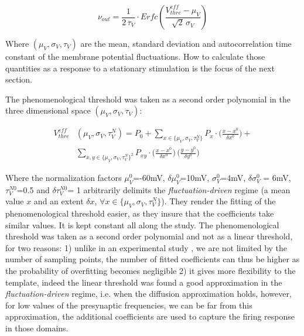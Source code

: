 \documentclass[8pt, colorlinks, a4paper]{article}
\begin{document}
\begin{equation}
\label{eq:template}
  \nu_{out} = \frac{1}{2\,\tau_V} \cdot 
  {Erfc}(\frac{V_{thre}^{eff}-\mu_V}{\sqrt{2} \, \sigma_V})
\end{equation}

Where \( (\mu_V, \sigma_V, \tau_V) \) are the mean, standard deviation
and autocorrelation time constant of the membrane potential
fluctuations. How to calculate those quantities as a response to a
stationary stimulation is the focus of the next section.

The phenomenological threshold was taken as a second order polynomial
in the three dimensional space \( (\mu_V, \sigma_V, \tau_V) \):

\begin{equation}
\label{eq:quadratic-threshold}
  \begin{split}
   V_{thre}^{eff} & (\mu_V, \sigma_V, \tau_V^N) = P_0 + 
   \sum_{x \in \{ \mu_V, \sigma_V, \tau_V^N\}} P_x \cdot \Big(  \frac{x - x^0}{\delta x^0} \Big) + \\
   & \sum_{ x,y \in \{ \mu_V, \sigma_V, \tau_V^N\}^2} P_{xy} \cdot
   \Big( \frac{x - x^0}{\delta x^0}  \Big) \,  \Big( \frac{y - y^0}{\delta y^0} \Big)
 \end{split}
\end{equation}

Where the normalization factors \(\mu_V^0\)=-60mV, \(\delta
\mu_V^0\)=10mV, \(\sigma_V^0\)=4mV, \(\delta \sigma_V^0\) = 6mV,
\(\tau_V^{N0}\)=0.5 and \(\delta \tau_V^{N0}\)= 1 arbitrarily delimits
the \emph{fluctuation-driven} regime (a mean value $x$ and an extent
$\delta x$, \(\forall x \in \{\mu_V, \sigma_V, \tau_V^N\}\)).  They
render the fitting of the phenomenological threshold easier, as they
insure that the coefficients take similar values. It is kept constant
all along the study. The phenomenological threshold was taken as a
second order polynomial and not as a linear threshold, for two
reasons: 1) unlike in an experimental study \cite{Zerlaut2016}, we are
not limited by the number of sampling points, the number of fitted
coefficients can thus be higher as the probability of overfitting
becomes negligible 2) it gives more flexibility to the template,
indeed the linear threshold was found a good approximation in the
\emph{fluctuation-driven} regime, i.e. when the diffusion approximation
holds, however, for low values of the presynaptic frequencies, we can
be far from this approximation, the additional coefficients are used
to capture the firing response in those domains.
\end{document}
